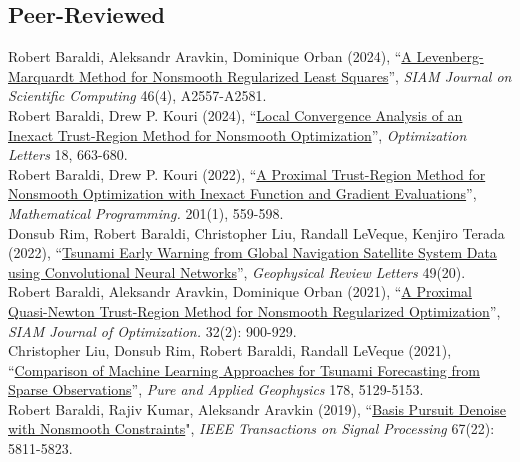 \documentclass[10pt, a4paper]{article}
\newcommand{\years}[1]{\marginnote{\scriptsize #1}}
\begin{document}
\subsection*{Peer-Reviewed}
\years{2024} Robert Baraldi, Aleksandr Aravkin, Dominique Orban (2024), ``\href{https://doi.org/10.1137/22M1538971}{A Levenberg-Marquardt Method for Nonsmooth Regularized Least Squares}'',  \emph{SIAM Journal on Scientific Computing} 46(4), A2557-A2581.\\
\years{2024} Robert Baraldi, Drew P. Kouri (2024), ``\href{https://link.springer.com/article/10.1007/s11590-023-02092-8}{Local Convergence Analysis of an Inexact Trust-Region Method for Nonsmooth Optimization}'', \emph{Optimization Letters} 18, 663-680.\\
\years{2022} Robert Baraldi, Drew P. Kouri (2022), ``\href{https://link.springer.com/article/10.1007/s10107-022-01915-3}{A Proximal Trust-Region Method for Nonsmooth Optimization with Inexact Function and Gradient Evaluations}'', \emph{Mathematical Programming.} 201(1), 559-598.\\
\years{2022} Donsub Rim, Robert Baraldi, Christopher Liu, Randall LeVeque, Kenjiro Terada (2022), ``\href{https://agupubs.onlinelibrary.wiley.com/doi/full/10.1029/2022GL099511}{Tsunami Early Warning from Global Navigation Satellite System Data using Convolutional Neural Networks}'', \emph{Geophysical Review Letters} 49(20).\\
\noindent
\years{2021} Robert Baraldi, Aleksandr Aravkin, Dominique Orban (2021), ``\href{https://epubs.siam.org/doi/abs/10.1137/21M1409536}{A Proximal Quasi-Newton Trust-Region Method for Nonsmooth Regularized Optimization}'', \emph{SIAM Journal of Optimization.} 32(2): 900-929.\\
\years{2021} Christopher Liu, Donsub Rim, Robert Baraldi, Randall LeVeque (2021), ``\href{https://link.springer.com/article/10.1007/s00024-021-02841-9}{Comparison of Machine Learning Approaches for Tsunami Forecasting from Sparse Observations}'', \emph{Pure and Applied Geophysics} 178, 5129-5153. \\
\noindent
\years{2019} Robert Baraldi, Rajiv Kumar, Aleksandr Aravkin  (2019), “\href{https://ieeexplore.ieee.org/document/8861392}{Basis Pursuit Denoise with Nonsmooth Constraints}", \emph{IEEE Transactions on Signal Processing} 67(22): 5811-5823.\\
\end{document}
